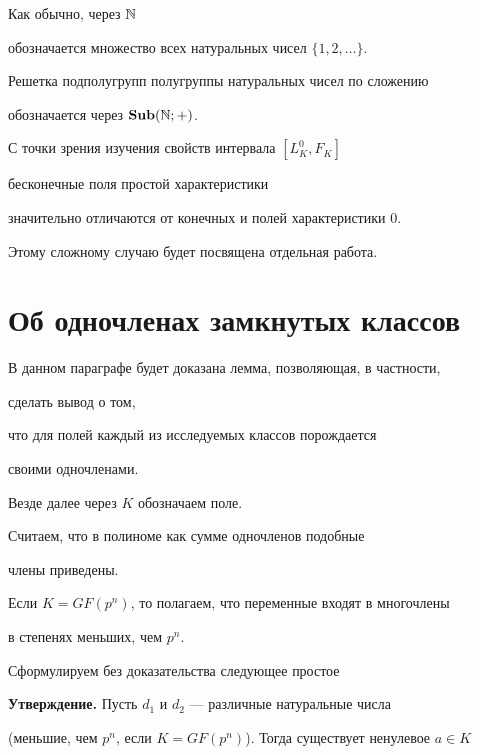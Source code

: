 Как обычно, через $\Bbb N$ 


обозначается множество всех натуральных чисел $\{ 1,2,\dotsc \}$.


Решетка подполугрупп полугруппы натуральных чисел по сложению


обозначается через $\bold{Sub} (\Bbb N;+)$.





С точки зрения изучения свойств интервала $[L^0_K,F_K]$


бесконечные поля простой характеристики 


значительно отличаются от конечных и полей характеристики $0$.


Этому сложному случаю будет посвящена отдельная работа.





\section{Об одночленах замкнутых классов}





В данном параграфе будет доказана лемма, позволяющая, в частности, 


сделать вывод о том,


что для полей каждый из исследуемых классов порождается


своими одночленами. 





Везде далее через $K$ обозначаем поле.


Считаем, что в полиноме как сумме одночленов подобные 


члены приведены. 


Если $K=GF(p^n)$, то полагаем, что переменные входят в многочлены


в степенях меньших, чем $p^n$. 





Сформулируем без доказательства следующее простое


\medskip





{\bf Утверждение.} Пусть $d_1$ и $d_2$ --- различные натуральные числа


(меньшие, чем $p^n$, если $K=GF(p^n)$). Тогда существует ненулевое $a \in K$ 


